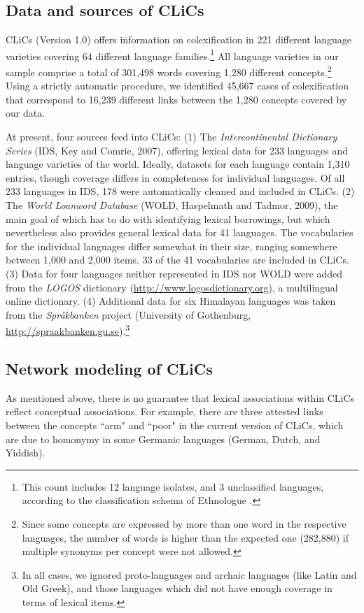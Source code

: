 \subsection{Data and sources of CLiCs}
CLiCs (Version 1.0) offers information on colexification in 221 different language varieties
covering 64 different language families.\footnote{This count includes 12 language isolates, and 3
unclassified languages, according to the classification schema of Ethnologue \cite{Lewis2013}.} All language
varieties in our sample comprise a total of 301,498 words covering 1,280 different
concepts.\footnote{Since some concepts are expressed by more than one word in the respective
languages, the number of words is higher than the expected one (282,880) if multiple synonyms per
concept were not allowed.} Using a strictly automatic procedure, we identified 45,667 cases of
colexification that correspond to 16,239 different links between the 1,280 concepts covered by our
data. 

At present, four sources feed into CLiCs: (1) The \emph{Intercontinental Dictionary Series} (IDS,
Key and Comrie, 2007\nocite{Key2007}), offering lexical data for 233 languages and language varieties of the world.
Ideally, datasets for each language contain 1,310 entries, though coverage differs in completeness
for individual languages. Of all 233 languages in IDS, 178 were automatically cleaned and included
in CLiCs. (2) The \emph{World Loanword Database} (WOLD, Haspelmath and Tadmor, 2009\nocite{Wold2009}), the main goal
of which has to do with identifying lexical borrowings, but which nevertheless also provides general
lexical data for 41 languages. The vocabularies for the individual languages differ somewhat in
their size, ranging somewhere between 1,000 and 2,000 items. 33 of the 41 vocabularies are included
in CLiCs.  (3) Data for four languages neither represented in IDS nor WOLD were added from the
\emph{LOGOS} dictionary (\url{http://www.logosdictionary.org}), a multilingual online dictionary.
(4) Additional data for six Himalayan languages was taken from the \emph{Spr\aa kbanken} project
(University of Gothenburg, \url{http://spraakbanken.gu.se}).\footnote{In all cases, we ignored
proto-languages and archaic languages (like Latin and Old Greek), and those languages which did not
have enough coverage in terms of lexical items.}

\subsection{Network modeling of CLiCs}
As mentioned above, there is no guarantee that lexical associations within CLiCs reflect conceptual
associations. For example, there are three attested links between the concepts ``arm" and ``poor" in
the current version of CLiCs, which are due to homonymy in some Germanic languages (German, Dutch,
and Yiddish).
 

